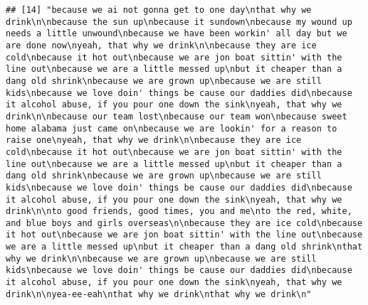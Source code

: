 \documentclass[]{article}
\begin{document}
\begin{verbatim}
## [14] "because we ai not gonna get to one day\nthat why we drink\n\nbecause the sun up\nbecause it sundown\nbecause my wound up needs a little unwound\nbecause we have been workin' all day but we are done now\nyeah, that why we drink\n\nbecause they are ice cold\nbecause it hot out\nbecause we are jon boat sittin' with the line out\nbecause we are a little messed up\nbut it cheaper than a dang old shrink\nbecause we are grown up\nbecause we are still kids\nbecause we love doin' things be cause our daddies did\nbecause it alcohol abuse, if you pour one down the sink\nyeah, that why we drink\n\nbecause our team lost\nbecause our team won\nbecause sweet home alabama just came on\nbecause we are lookin' for a reason to raise one\nyeah, that why we drink\n\nbecause they are ice cold\nbecause it hot out\nbecause we are jon boat sittin' with the line out\nbecause we are a little messed up\nbut it cheaper than a dang old shrink\nbecause we are grown up\nbecause we are still kids\nbecause we love doin' things be cause our daddies did\nbecause it alcohol abuse, if you pour one down the sink\nyeah, that why we drink\n\nto good friends, good times, you and me\nto the red, white, and blue boys and girls overseas\n\nbecause they are ice cold\nbecause it hot out\nbecause we are jon boat sittin' with the line out\nbecause we are a little messed up\nbut it cheaper than a dang old shrink\nthat why we drink\n\nbecause we are grown up\nbecause we are still kids\nbecause we love doin' things be cause our daddies did\nbecause it alcohol abuse, if you pour one down the sink\nyeah, that why we drink\n\nyea-ee-eah\nthat why we drink\nthat why we drink\n"                                                                                                                                                                                                                                                                                                                                                                                                                                                                                                                                                                                                                                                                                                                                                                                                                                                                                                                                                                                                                                                                                                                                                                                                                                                                

\end{verbatim}
\end{document}
